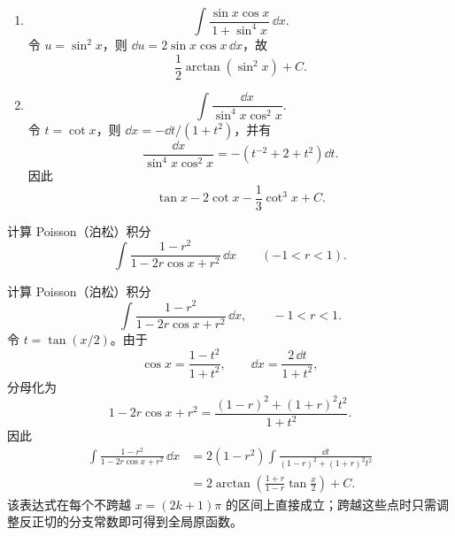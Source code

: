 \begin{xsolution}
\begin{enumerate}[label=(\arabic*)]
    \item
    \[
      \int\frac{\sin x\cos x}{1+\sin^4x}\,\dd x.
    \]
    令 $u=\sin^2x$，则 $\dd u=2\sin x\cos x\,\dd x$，故
    \[
      \boxed{\frac12\arctan(\sin^2x)+C}.
    \]

    \item
    \[
      \int\frac{\dd x}{\sin^4x\cos^2x}.
    \]
    令 $t=\cot x$，则 $\dd x=-\dd t/(1+t^2)$，并有
    \[
      \frac{\dd x}{\sin^4x\cos^2x}
      =-\left(t^{-2}+2+t^2\right)\dd t.
    \]
    因此
    \[
      \boxed{\tan x-2\cot x-\frac13\cot^3x+C}.
    \]
  \end{enumerate}
\end{xsolution}


\begin{xexercise}[4]
计算 Poisson（泊松）积分
  \[
    \int\frac{1-r^2}{1-2r\cos x+r^2}\,\dd x
    \qquad(-1<r<1).
  \]
\end{xexercise}
\begin{xsolution}
计算 Poisson（泊松）积分
  \[
    \int\frac{1-r^2}{1-2r\cos x+r^2}\,\dd x,
    \qquad -1<r<1.
  \]
  令 $t=\tan(x/2)$。由于
  \[
    \cos x=\frac{1-t^2}{1+t^2},
    \qquad
    \dd x=\frac{2\,\dd t}{1+t^2},
  \]
  分母化为
  \[
    1-2r\cos x+r^2
    =\frac{(1-r)^2+(1+r)^2t^2}{1+t^2}.
  \]
  因此
  \begin{align*}
    \int\frac{1-r^2}{1-2r\cos x+r^2}\,\dd x
    &=2(1-r^2)\int
      \frac{\dd t}{(1-r)^2+(1+r)^2t^2}\\
    &=\boxed{2\arctan\left(
      \frac{1+r}{1-r}\tan\frac x2
      \right)+C}.
  \end{align*}
  该表达式在每个不跨越 $x=(2k+1)\pi$ 的区间上直接成立；跨越这些点时只需调整反正切的分支常数即可得到全局原函数。
\end{xsolution}


